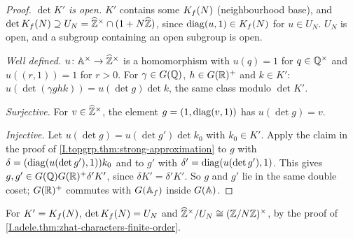 \begin{theorem}
\end{theorem}
\begin{proof}
\emph{$\det K'$ is open.} $K'$ contains some $K_f(N)$ (neighbourhood base), and
$\det K_f(N)\supseteq U_N=\widehat{\mathbb{Z}}^\times\cap(1+N\widehat{\mathbb{Z}})$, since $\operatorname{diag}(u,1)\in K_f(N)$ for $u\in U_N$. $U_N$ is open, and a
subgroup containing an open subgroup is open.

\emph{Well defined.} $u\colon\mathbb{A}^\times\to\widehat{\mathbb{Z}}^\times$ is a homomorphism with $u(q)=1$ for $q\in\mathbb{Q}^\times$ and $u((r,1))=1$
for $r>0$. For $\gamma\in G(\mathbb{Q})$, $h\in G(\mathbb{R})^+$ and $k\in K'$:
$u(\det(\gamma ghk))=u(\det g)\det k$, the same class modulo $\det K'$.

\emph{Surjective.} For $v\in\widehat{\mathbb{Z}}^\times$, the element $g=(1,\operatorname{diag}(v,1))$ has $u(\det g)=v$.

\emph{Injective.} Let $u(\det g)=u(\det g')\det k_0$ with $k_0\in K'$. Apply the claim in the proof of
\cref{I.topgrp.thm:strong-approximation} to $g$ with $\delta=(\operatorname{diag}(u(\det g'),1))k_0$ and to $g'$ with
$\delta'=\operatorname{diag}(u(\det g'),1)$. This gives $g,g'\in G(\mathbb{Q})G(\mathbb{R})^+\delta'K'$, since $\delta K'=\delta'K'$. So $g$ and $g'$
lie in the same double coset; $G(\mathbb{R})^+$ commutes with $G(\mathbb{A}_f)$ inside $G(\mathbb{A})$.
\end{proof}
\noindent For $K'=K_f(N)$, $\det K_f(N)=U_N$ and $\widehat{\mathbb{Z}}^\times/U_N\cong(\mathbb{Z}/N\mathbb{Z})^\times$, by the proof of
\cref{I.adele.thm:zhat-characters-finite-order}.
